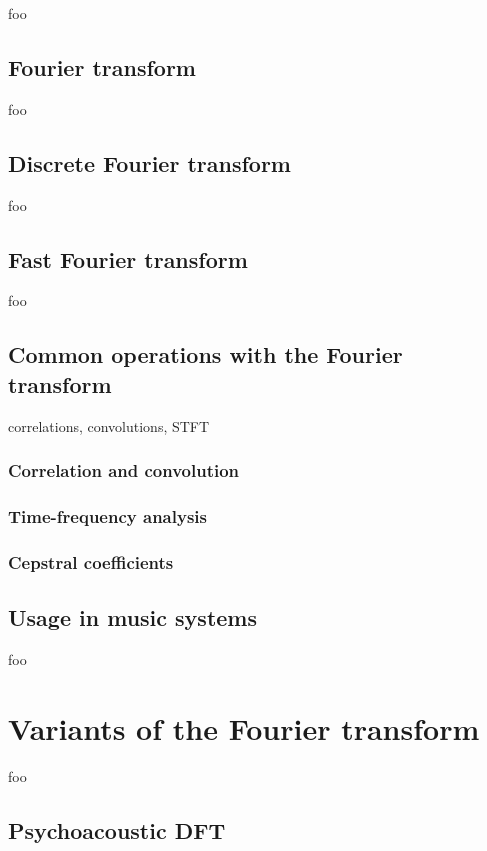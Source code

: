\documentclass[letter,12pt]{article}
\begin{document}
foo

\subsection{Fourier transform}

foo

\subsection{Discrete Fourier transform}

foo

\subsection{Fast Fourier transform}

foo

\subsection{Common operations with the Fourier transform}

correlations, convolutions, STFT

\subsubsection{Correlation and convolution}

\subsubsection{Time-frequency analysis}

\subsubsection{Cepstral coefficients}

\subsection{Usage in music systems}

foo

\section{Variants of the Fourier transform}

foo

\subsection{Psychoacoustic DFT}
\end{document}
